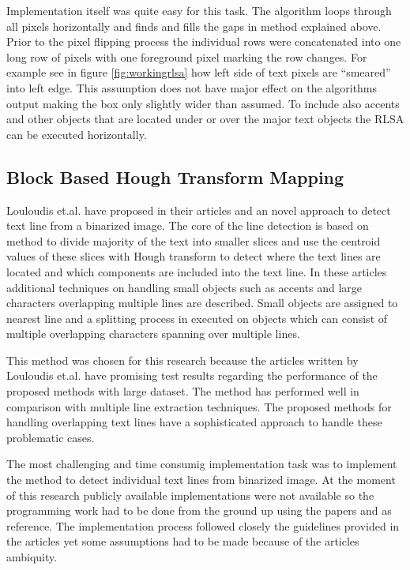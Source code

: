 \documentclass{article}
\begin{document}
          Implementation itself was quite easy for this task. The algorithm loops through all pixels horizontally and finds and fills the gaps in method explained above. Prior to the pixel flipping process the individual rows were concatenated into one long row of pixels with one foreground pixel marking the row changes. For example see in figure \ref{fig:workingrlsa} how left side of text pixels are ``smeared'' into left edge. This assumption does not have major effect on the algorithms output making the box only slightly wider than assumed. To include also accents and other objects that are located under or over the major text objects the RLSA can be executed horizontally.


        \subsection{Block Based Hough Transform Mapping}
          Louloudis et.al. have proposed in their articles \cite{Louloudis1} and \cite{Louloudis2} an novel approach to detect text line from a binarized image. The core of the line detection is based on method to divide majority of the text into smaller slices and use the centroid values of these slices with Hough transform to detect where the text lines are located and which components are included into the text line. In these articles additional techniques on handling small objects such as accents and large characters overlapping multiple lines are described. Small objects are assigned to nearest line and a splitting process in executed on objects which can consist of multiple overlapping characters spanning over multiple lines.

          This method was chosen for this research because the articles written by Louloudis et.al. have promising test results regarding the performance of the proposed methods with large dataset. The method has performed well in comparison with multiple line extraction techniques.\cite{Razak} The proposed methods for handling overlapping text lines have a sophisticated approach to handle these problematic cases.

          The most challenging and time consumig implementation task was to implement the method to detect individual text lines from binarized image. At the moment of this research publicly available implementations were not available so the programming work had to be done from the ground up using the papers \cite{Louloudis1} and \cite{Louloudis2} as reference. The implementation process followed closely the guidelines provided in the articles yet some assumptions had to be made because of the articles ambiquity.
\end{document}
